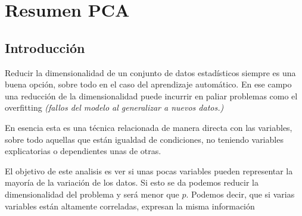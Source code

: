 \chapter{Resumen PCA}
\section{Introducción}
Reducir la dimensionalidad de un conjunto de datos estadísticos siempre es una buena opción, sobre todo en el caso del aprendizaje automático. En ese campo una reducción de la dimensionalidad puede incurrir en paliar problemas como el overfitting \textit{(fallos del modelo al generalizar a nuevos datos.)}

En esencia esta es una técnica relacionada de manera directa con las variables, sobre todo aquellas que están igualdad de condiciones, no teniendo variables explicatorias o dependientes unas de otras.

El objetivo de este analisis es ver si unas pocas variables pueden representar la mayoría de la variación de los datos. Si esto se da podemos reducir la dimensionalidad del problema y será menor que $p$.
Podemos decir, que si varias variables están altamente correladas, expresan la misma información